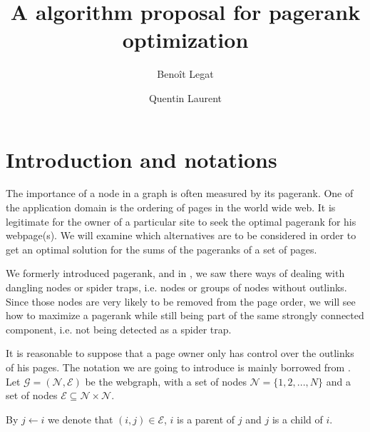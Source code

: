 \documentclass{article}
\author{Benoît Legat \and Quentin Laurent}
\title{A algorithm proposal for pagerank optimization}
\newcommand{\1}{\mathbf{1}}
\theoremstyle{definition}
\begin{document}
\maketitle

\section{Introduction and notations}
The importance of a node in a graph is often measured by its pagerank. One of the application domain is the ordering of pages in the world wide web. It is legitimate for the owner of a particular site to seek the optimal pagerank for his webpage(s). We will examine which alternatives are to be considered in order to get an optimal solution for the sums of the pageranks of a set of pages.

We formerly introduced pagerank, and in \cite{leskovec}, we saw there ways of dealing with dangling nodes or spider traps, i.e. nodes or groups of nodes without outlinks. Since those nodes are very likely to be removed from the page order, we will see how to maximize a pagerank while still being part of the same strongly connected component, i.e. not being detected as a spider trap.

It is reasonable to suppose that a page owner only has control over the outlinks of his pages. The notation we are going to introduce is mainly borrowed from \cite{de2008maximizing}.
Let \(\mathcal{G} = (\mathcal{N},\mathcal{E})\) be the webgraph, with a set of nodes  \(\mathcal{N} = \{1,2,...,N\}\) and a set of nodes \(\mathcal{E}\subseteq \mathcal{N}\times \mathcal{N}\).

By \(j \leftarrow i\) we denote that \((i,j)\in \mathcal{E}\), \(i\) is a parent of \(j\) and \(j\) is a child of \(i\).
\end{document}
